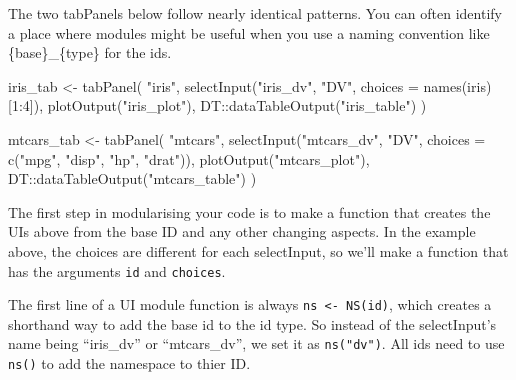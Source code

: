 \documentclass[
]{book}
\newenvironment{Shaded}{\begin{snugshade}}{\end{snugshade}}
\newcommand{\AttributeTok}[1]{\textcolor[rgb]{0.77,0.63,0.00}{#1}}
\newcommand{\DecValTok}[1]{\textcolor[rgb]{0.00,0.00,0.81}{#1}}
\newcommand{\FunctionTok}[1]{\textcolor[rgb]{0.00,0.00,0.00}{#1}}
\newcommand{\NormalTok}[1]{#1}
\newcommand{\OtherTok}[1]{\textcolor[rgb]{0.56,0.35,0.01}{#1}}
\newcommand{\SpecialCharTok}[1]{\textcolor[rgb]{0.00,0.00,0.00}{#1}}
\newcommand{\StringTok}[1]{\textcolor[rgb]{0.31,0.60,0.02}{#1}}
\begin{document}
The two tabPanels below follow nearly identical patterns. You can often identify a place where modules might be useful when you use a naming convention like \{base\}\_\{type\} for the ids.

\begin{Shaded}
\begin{Highlighting}[]
\NormalTok{iris\_tab }\OtherTok{\textless{}{-}} \FunctionTok{tabPanel}\NormalTok{(}
  \StringTok{"iris"}\NormalTok{,}
  \FunctionTok{selectInput}\NormalTok{(}\StringTok{"iris\_dv"}\NormalTok{, }\StringTok{"DV"}\NormalTok{, }\AttributeTok{choices =} \FunctionTok{names}\NormalTok{(iris)[}\DecValTok{1}\SpecialCharTok{:}\DecValTok{4}\NormalTok{]),}
  \FunctionTok{plotOutput}\NormalTok{(}\StringTok{"iris\_plot"}\NormalTok{),}
\NormalTok{  DT}\SpecialCharTok{::}\FunctionTok{dataTableOutput}\NormalTok{(}\StringTok{"iris\_table"}\NormalTok{)}
\NormalTok{)}

\NormalTok{mtcars\_tab }\OtherTok{\textless{}{-}} \FunctionTok{tabPanel}\NormalTok{(}
  \StringTok{"mtcars"}\NormalTok{,}
  \FunctionTok{selectInput}\NormalTok{(}\StringTok{"mtcars\_dv"}\NormalTok{, }\StringTok{"DV"}\NormalTok{, }\AttributeTok{choices =} \FunctionTok{c}\NormalTok{(}\StringTok{"mpg"}\NormalTok{, }\StringTok{"disp"}\NormalTok{, }\StringTok{"hp"}\NormalTok{, }\StringTok{"drat"}\NormalTok{)),}
  \FunctionTok{plotOutput}\NormalTok{(}\StringTok{"mtcars\_plot"}\NormalTok{),}
\NormalTok{  DT}\SpecialCharTok{::}\FunctionTok{dataTableOutput}\NormalTok{(}\StringTok{"mtcars\_table"}\NormalTok{)}
\NormalTok{)}
\end{Highlighting}
\end{Shaded}

The first step in modularising your code is to make a function that creates the UIs above from the base ID and any other changing aspects. In the example above, the choices are different for each selectInput, so we'll make a function that has the arguments \texttt{id} and \texttt{choices}.

The first line of a UI module function is always \texttt{ns\ \textless{}-\ NS(id)}, which creates a shorthand way to add the base id to the id type. So instead of the selectInput's name being ``iris\_dv'' or ``mtcars\_dv'', we set it as \texttt{ns("dv")}. All ids need to use \texttt{ns()} to add the namespace to thier ID.
\end{document}
